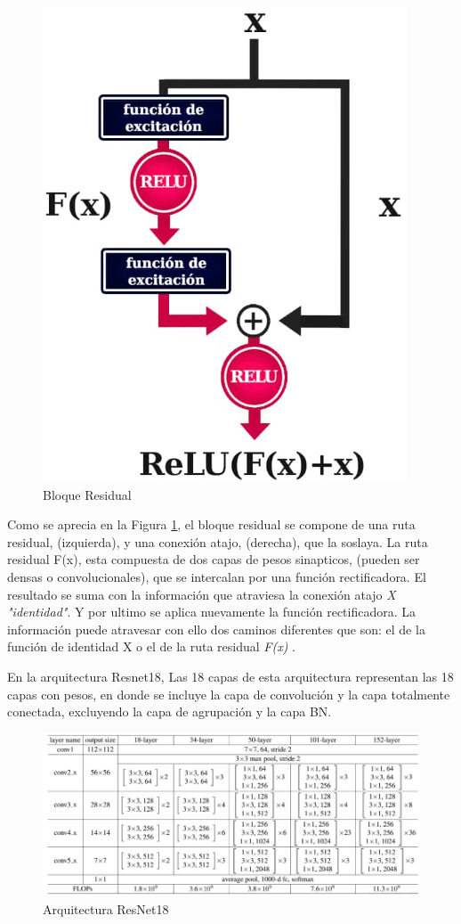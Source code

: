 				\begin{figure}[ht]
					\centering
					\includegraphics[scale=0.6]{Figs/67.png}
					\caption{Bloque Residual}
					\label{fig:Bloque}
				\end{figure}
			
				Como se aprecia en la Figura \ref{fig:Bloque}, el bloque residual se compone de una ruta residual, (izquierda), y una conexión atajo, (derecha), que la soslaya. La ruta residual F(x), esta compuesta de dos capas de pesos sinapticos, (pueden ser densas o convolucionales), que se intercalan por una función rectificadora. El resultado se suma con la información que atraviesa la conexión atajo \textit{X "identidad"}. Y por ultimo se aplica nuevamente la función rectificadora. La información puede atravesar con ello dos caminos diferentes que son: el de la función de identidad X o el de la ruta residual \textit{F(x)} \cite{ref_5}.

				\newpage
				En la arquitectura Resnet18, Las 18 capas de esta arquitectura representan las 18 capas con pesos, en donde se incluye la capa de convolución y la capa totalmente conectada, excluyendo la capa de agrupación y la capa BN.
				
				\begin{figure}[ht]
					\centering
					\includegraphics[scale=0.65]{Figs/68.png}
					\caption{Arquitectura ResNet18}
					\label{fig:ArqRes18}
				\end{figure}
				

